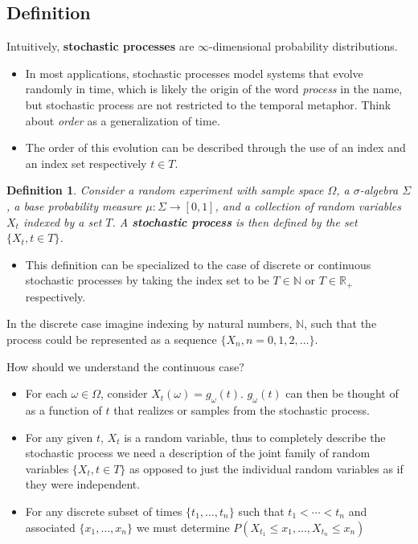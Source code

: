 \subsection{Definition}
\begin{frame}
Intuitively, \textbf{stochastic processes} are $\infty$-dimensional probability distributions.
\end{frame}

\begin{frame}
\begin{itemize}
\item In most applications, stochastic processes model systems that evolve randomly in time, which is likely the origin of the word \emph{process} in the name, but stochastic process are not restricted to the temporal metaphor. Think about \emph{order} as a generalization of time.
\item The order of this evolution can be described through the use of an index and an index set respectively $t \in T$.
\end{itemize}

\newtheorem{stpo}{Definition}
\begin{stpo}
Consider a random experiment with sample space $\Omega$, a $\sigma$-algebra $\Sigma$, a base probability measure $\mu : \Sigma \rightarrow [0,1]$, and a collection of random variables $X_t$ indexed by a set $T$. A \textbf{stochastic process} is then defined by the set $\{X_t, t \in T\}$.
\end{stpo}
\begin{itemize}
\item This definition can be specialized to the case of discrete or continuous stochastic processes by taking the index set to be $T \in \mathbb{N}$ or $T \in \mathbb{R}_+$ respectively.
\end{itemize}
\end{frame}

\begin{frame}
In the discrete case imagine indexing by natural numbers, $\mathbb{N}$, such that the process could be represented as a sequence $\{ X_n, n = 0,1,2,\ldots \}$.
\end{frame}

\begin{frame}
How should we understand the continuous case?
\begin{itemize}
\item For each $\omega \in \Omega$, consider $X_t(\omega)=g_\omega(t)$. $g_\omega(t)$ can then be thought of as a function of $t$ that realizes or samples from the stochastic process.
\item For any given $t$, $X_t$ is a random variable, thus to completely describe the stochastic process we need a description of the joint family of random variables $\{ X_t, t \in T \}$ as opposed to just the individual random variables as if they were independent.
\item For any discrete subset of times $\{ t_1, \ldots, t_n \}$ such that $t_1 < \cdots < t_n$ and associated $\{ x_1, \ldots, x_n \}$ we must determine $	P(X_{t_1} \leq x_1, \ldots, X_{t_n} \leq x_n) $
\end{itemize}
\end{frame}

